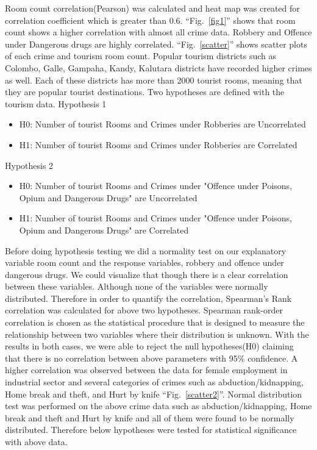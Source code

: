 \documentclass[conference]{IEEEtran}
\begin{document}
Room count correlation(Pearson) was calculated and heat map was created for correlation coefficient which is greater than 0.6. ``Fig.~\ref{fig1}'' shows that room count shows a higher correlation with almost all crime data. Robbery and Offence under Dangerous drugs are highly correlated. ``Fig.~\ref{scatter}'' shows scatter plots of each crime and tourism room count. Popular tourism districts such as Colombo, Galle, Gampaha, Kandy, Kalutara districts have recorded higher crimes as well. Each of these districts has more than 2000 tourist rooms, meaning that they are popular tourist destinations.
Two hypotheses are defined with the tourism data.
Hypothesis 1
\begin{itemize}
    \item H0: Number of tourist Rooms and Crimes under Robberies are Uncorrelated
    \item H1: Number of tourist Rooms and Crimes under Robberies are Correlated
\end{itemize}
Hypothesis 2
\begin{itemize}
    \item H0: Number of tourist Rooms and Crimes under "Offence under Poisons, Opium and Dangerous Drugs" are Uncorrelated
    \item H1: Number of tourist Rooms and Crimes under "Offence under Poisons, Opium and Dangerous Drugs" are Correlated
\end{itemize}
Before doing hypothesis testing we did a normality test on our explanatory variable room count and the response variables, robbery and offence under dangerous drugs. We could visualize that though there is a clear correlation between these variables. Although none of the variables were normally distributed. Therefore in order to quantify the correlation, Spearman's Rank correlation was calculated for above two hypotheses. Spearman rank-order correlation is chosen as the statistical procedure that is designed to measure the relationship between two variables where their distribution is unknown. With the results in both cases, we were able to reject the null hypotheses(H0) claiming that there is no correlation between above parameters with 95\% confidence.
A higher correlation was observed between the data for female employment in industrial sector and several categories of crimes such as abduction/kidnapping, Home break and theft, and Hurt by knife ``Fig.~\ref{scatter2}''. Normal distribution test was performed on the above crime data such as abduction/kidnapping, Home break and theft and Hurt by knife and all of them were found to be normally distributed. Therefore below hypotheses were tested for statistical significance with above data.
\end{document}
